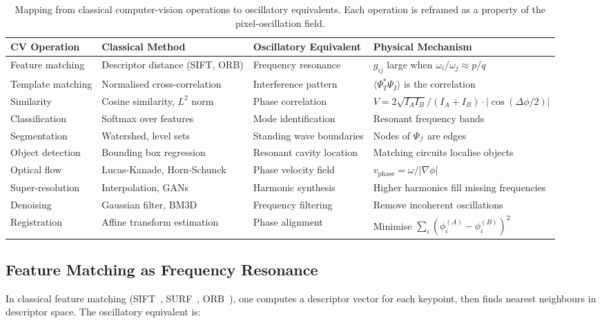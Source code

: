 \documentclass[11pt,twocolumn,a4paper]{article}
\begin{document}
\begin{table}[t!]
\centering
\caption{Mapping from classical computer-vision operations to oscillatory equivalents. Each operation is reframed as a property of the pixel-oscillation field.}
\label{tab:mapping}
\begin{tabular}{@{}p{3.5cm}p{4.0cm}p{4.0cm}p{4.5cm}@{}}
\toprule
\textbf{CV Operation} & \textbf{Classical Method} & \textbf{Oscillatory Equivalent} & \textbf{Physical Mechanism} \\
\midrule
Feature matching & Descriptor distance (SIFT, ORB) & Frequency resonance & $g_{ij}$ large when $\omega_i/\omega_j \approx p/q$ \\[4pt]
Template matching & Normalised cross-correlation & Interference pattern & $\langle \Psi_T^* \Psi_I \rangle$ is the correlation \\[4pt]
Similarity & Cosine similarity, $L^2$ norm & Phase correlation & $V = 2\sqrt{I_A I_B}/(I_A + I_B) \cdot |\cos(\Delta\phi/2)|$ \\[4pt]
Classification & Softmax over features & Mode identification & Resonant frequency bands \\[4pt]
Segmentation & Watershed, level sets & Standing wave boundaries & Nodes of $\Psi_{\mathcal{I}}$ are edges \\[4pt]
Object detection & Bounding box regression & Resonant cavity location & Matching circuits localise objects \\[4pt]
Optical flow & Lucas-Kanade, Horn-Schunck & Phase velocity field & $v_{\text{phase}} = \omega/|\nabla\phi|$ \\[4pt]
Super-resolution & Interpolation, GANs & Harmonic synthesis & Higher harmonics fill missing frequencies \\[4pt]
Denoising & Gaussian filter, BM3D & Frequency filtering & Remove incoherent oscillations \\[4pt]
Registration & Affine transform estimation & Phase alignment & Minimise $\sum_i (\phi_i^{(A)} - \phi_i^{(B)})^2$ \\
\bottomrule
\end{tabular}
\end{table}

\subsection{Feature Matching as Frequency Resonance}

In classical feature matching (SIFT~\citep{lowe2004}, SURF~\citep{bay2008}, ORB~\citep{rublee2011}), one computes a descriptor vector for each keypoint, then finds nearest neighbours in descriptor space. The oscillatory equivalent is:
\end{document}
